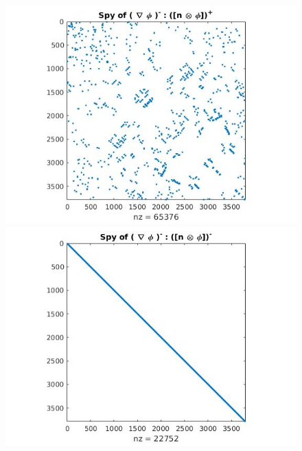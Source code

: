 \documentclass[a4paper]{book}
\begin{document}
\begin{figure}[H]
\begin{minipage}[c]{0.5\textwidth}
    \includegraphics[width=\textwidth]{figure33.jpg}
  \caption{$( \nabla \phi^- ,(n \otimes \phi)^+)_{\Gamma \cup \Gamma_D}$}
  \label{fig:figure33}
  \end{minipage}\hfill
    \begin{minipage}[c]{0.5\textwidth}
    \includegraphics[width=\textwidth]{figure34.jpg}
  \caption{$( \nabla \phi^- ,(n \otimes \phi)^-)_{\Gamma \cup \Gamma_D}$}
  \label{fig:figure34}
  \end{minipage}\hfill
  \begin{subfigure}{\textwidth}	
\centering

\end{subfigure}
\end{figure}
\end{document}
